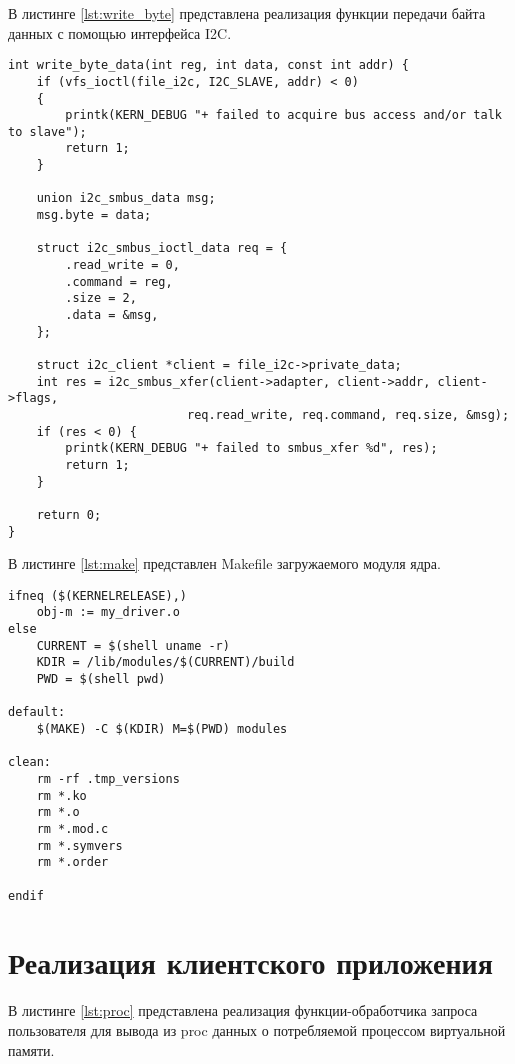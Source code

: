 В листинге \ref{lst:write_byte} представлена реализация функции передачи байта данных с помощью интерфейса I2C.

\begin{lstlisting}[label=lst:write_byte,caption=Реализация функции передачи байта данных с помощью интерфейса I2C]
int write_byte_data(int reg, int data, const int addr) {
    if (vfs_ioctl(file_i2c, I2C_SLAVE, addr) < 0)
    {
        printk(KERN_DEBUG "+ failed to acquire bus access and/or talk to slave");
        return 1;
    }

    union i2c_smbus_data msg;
    msg.byte = data;

    struct i2c_smbus_ioctl_data req = {
        .read_write = 0,
        .command = reg,
        .size = 2,
        .data = &msg,
    };

    struct i2c_client *client = file_i2c->private_data;
    int res = i2c_smbus_xfer(client->adapter, client->addr, client->flags,
                         req.read_write, req.command, req.size, &msg);
    if (res < 0) {
        printk(KERN_DEBUG "+ failed to smbus_xfer %d", res);
        return 1;
    }

    return 0;
}
\end{lstlisting}

В листинге \ref{lst:make} представлен Makefile загружаемого модуля ядра.

\begin{lstlisting}[label=lst:make,caption=Makefile загружаемого модуля ядра]
ifneq ($(KERNELRELEASE),)
	obj-m := my_driver.o
else
	CURRENT = $(shell uname -r)
	KDIR = /lib/modules/$(CURRENT)/build
	PWD = $(shell pwd)

default:
	$(MAKE) -C $(KDIR) M=$(PWD) modules

clean:
	rm -rf .tmp_versions
	rm *.ko
	rm *.o
	rm *.mod.c
	rm *.symvers
	rm *.order

endif
\end{lstlisting}

\section{Реализация клиентского приложения}

В листинге \ref{lst:proc} представлена реализация функции-обработчика запроса пользователя для вывода из proc данных о потребляемой процессом виртуальной памяти.

